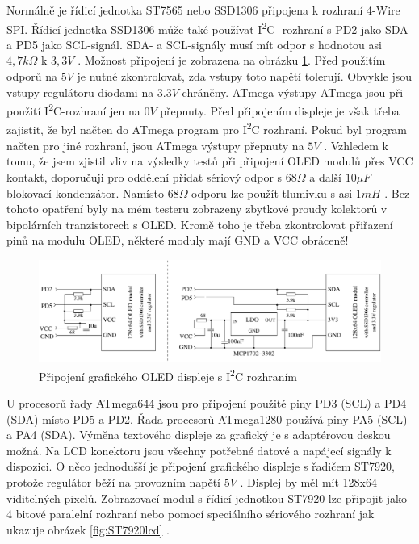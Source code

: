 Normálně je řídicí jednotka ST7565 nebo SSD1306 připojena k rozhraní 4-Wire SPI.
Řídicí jednotka SSD1306 může také používat I\textsuperscript{2}C- rozhraní s PD2 jako SDA- a PD5 jako SCL-signál.
SDA- a SCL-signály musí mít  odpor s hodnotou asi \(4,7k\Omega\) k \(3,3V\) .
Možnost připojení je zobrazena na obrázku \ref{fig:ssd1306i2c}.
Před použitím  odporů na \(5V\) je nutné zkontrolovat, zda vstupy toto napětí tolerují.
Obvykle jsou vstupy regulátoru diodami na \(3.3V\) chráněny.
ATmega výstupy ATmega jsou při použití I\textsuperscript{2}C-rozhraní jen na  \(0V\) přepnuty.
Před připojením displeje je však třeba zajistit, že byl načten do ATmega program
pro I\textsuperscript{2}C rozhraní.
Pokud byl program načten pro jiné rozhraní, jsou ATmega výstupy přepnuty na \(5V\) .
Vzhledem k tomu, že jsem zjistil vliv na výsledky testů při připojení OLED modulů přes VCC kontakt,
doporučuji pro oddělení přidat sériový odpor s \(68\Omega\) a další \(10\mu F\) blokovací kondenzátor. 
Namísto \(68\Omega\) odporu lze použít tlumivku s asi \(1mH\) .
Bez tohoto opatření byly na mém testeru zobrazeny zbytkové proudy kolektorů v bipolárních tranzistorech s OLED.
Kromě toho je třeba zkontrolovat přiřazení pinů na modulu OLED, některé moduly mají GND a VCC obráceně!

\begin{figure}[H]
\centering
\includegraphics[width=.814\textwidth]{../FIG/SSD1306_I2C.pdf}
\caption{Připojení grafického OLED displeje s I\textsuperscript{2}C rozhraním}
\label{fig:ssd1306i2c}
\end{figure}

U procesorů řady ATmega644 jsou pro připojení použité piny PD3 (SCL) a PD4 (SDA) místo PD5 a PD2.
Řada procesorů ATmega1280 používá piny PA5 (SCL) a PA4 (SDA).
Výměna textového displeje za grafický je s adaptérovou deskou možná.
Na LCD konektoru jsou všechny potřebné datové a napájecí signály k dispozici.
O něco jednodušší je připojení grafického displeje s řadičem ST7920, protože
regulátor běží na provozním napětí \(5V\) .
Displej by měl mít 128x64 viditelných pixelů.
Zobrazovací modul s řídicí jednotkou ST7920  lze připojit jako 4 bitové paralelní rozhraní nebo
pomocí speciálního sériového rozhraní jak ukazuje obrázek \ref{fig:ST7920lcd} .

